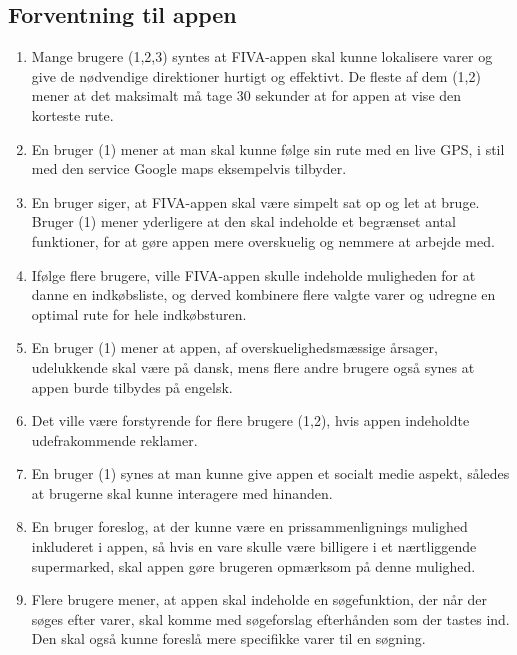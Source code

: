 \documentclass[12pt]{article}
\begin{document}
\subsection{Forventning til appen}
\begin{enumerate}
\item Mange brugere (1,2,3) syntes at FIVA-appen skal kunne lokalisere varer og give de nødvendige direktioner hurtigt og effektivt. De fleste af dem (1,2) mener at det maksimalt må tage 30 sekunder at for appen at vise den korteste rute.

\item En bruger (1) mener at man skal kunne følge sin rute med en live GPS, i stil med den service Google maps eksempelvis tilbyder.\\

\item En bruger siger, at FIVA-appen skal være simpelt sat op og let at bruge. Bruger (1) mener yderligere at den skal indeholde et begrænset antal funktioner, for at gøre appen mere overskuelig og nemmere at arbejde med. 

\item Ifølge flere brugere, ville FIVA-appen skulle indeholde muligheden for at danne en indkøbsliste, og derved kombinere flere valgte varer og udregne en optimal rute for hele indkøbsturen.

\item En bruger (1) mener at appen, af overskuelighedsmæssige årsager, udelukkende skal være på dansk, mens flere andre brugere også synes at appen burde tilbydes på engelsk.

\item Det ville være forstyrende for flere brugere (1,2), hvis appen indeholdte udefrakommende reklamer.

\item En bruger (1) synes at man kunne give appen et socialt medie aspekt, således at brugerne skal kunne interagere med hinanden.

\item En bruger foreslog, at der kunne være en prissammenlignings mulighed inkluderet i appen, så hvis en vare skulle være billigere i et nærtliggende supermarked, skal appen gøre brugeren opmærksom på denne mulighed.

\item Flere brugere mener, at appen skal indeholde en søgefunktion, der når der søges efter varer, skal komme med søgeforslag efterhånden som der tastes ind. Den skal også kunne foreslå mere specifikke varer til en søgning.
\end{enumerate}
\end{document}
